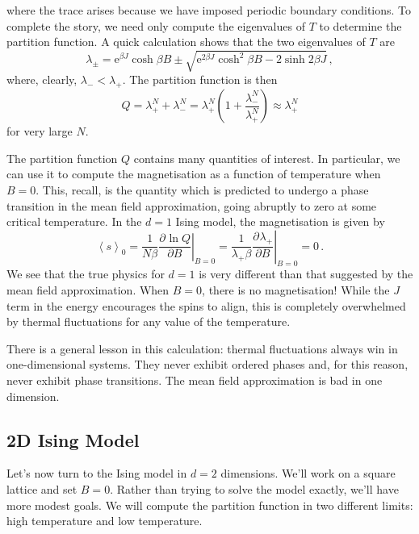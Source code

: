 \documentclass{article}
\theoremstyle{plain}\theoremheaderfont{\normalfont\bfseries}\theorembodyfont{\rmfamily}\theoremseparator{.}\newtheorem*{thm}{Theorem}\newtheorem*{law}{Law}\newtheorem*{pos}{Postulate}
\numberwithin{equation}{section}
\newcommand{\ee}{\mathrm{e}}
\newcommand{\pdv}[3][]{\frac{\partial^{#1} #2}{{\partial #3}^{#1}}}
\newcommand{\eval}[1]{\left\langle #1 \right\rangle}
\begin{document}
    where the trace arises because we have imposed periodic boundary conditions. To complete the story, we need only compute the eigenvalues of \(T\) to determine the partition function. A quick calculation shows that the two eigenvalues of \(T\) are
    \begin{equation}
        \lambda_\pm = \ee^{\beta J}\cosh\beta B\pm\sqrt{\ee^{2\beta J}\cosh^2\beta B-2\sinh 2\beta J}\,,
    \end{equation}
    where, clearly, \(\lambda_-<\lambda_+\). The partition function is then
    \begin{equation}
        Q=\lambda_+^N + \lambda_-^N =\lambda_+^N \left(1+\frac{\lambda_-^N}{\lambda_+^N}\right)\approx\lambda_+^N
    \end{equation}
    for very large \(N\).

    The partition function \(Q\) contains many quantities of interest. In particular, we can use it to compute the magnetisation as a function of temperature when \(B=0\). This, recall, is the quantity which is predicted to undergo a phase transition in the mean field approximation, going abruptly to zero at some critical temperature. In the \(d=1\) Ising model, the magnetisation is given by
    \begin{equation}
        \eval{s}_0=\frac{1}{N\beta}\left.\pdv{\ln Q}{B}\right|_{B=0}=\frac{1}{\lambda_+\beta}\left.\pdv{\lambda_+}{B}\right|_{B=0}=0\,.
    \end{equation}
    We see that the true physics for \(d=1\) is very different than that suggested by the mean field approximation. When \(B=0\), there is no magnetisation! While the \(J\) term in the energy encourages the spins to align, this is completely overwhelmed by thermal fluctuations for any value of the temperature.

    There is a general lesson in this calculation: thermal fluctuations always win in one-dimensional systems. They never exhibit ordered phases and, for this reason, never exhibit phase transitions. The mean field approximation is bad in one dimension.

    \subsection{2D Ising Model}
    Let's now turn to the Ising model in \(d=2\) dimensions. We'll work on a square lattice and set \(B=0\). Rather than trying to solve the model exactly, we'll have more modest goals. We will compute the partition function in two different limits: high temperature and low temperature.
\end{document}
